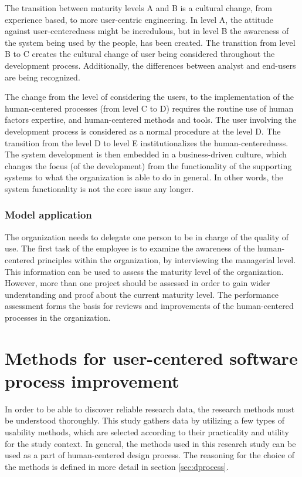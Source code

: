 \documentclass[12pt,a4paper,oneside,pdftex]{report}
\begin{document}
The transition between maturity levels A and B is a cultural change, from experience based, to more user-centric engineering. In level A, the attitude against user-centeredness might be incredulous, but in level B the awareness of the system being used by the people, has been created. The transition from level B to C creates the cultural change of user being considered throughout the development process. Additionally, the differences between analyst and end-users are being recognized. \citep{RefWorks:30}

The change from the level of considering the users, to the implementation of the human-centered processes (from level C to D) requires the routine use of human factors expertise, and human-centered methods and tools. The user involving the development process is considered as a normal procedure at the level D. The transition from the level D to level E institutionalizes the human-centeredness. The system development is then embedded in a business-driven culture, which changes the focus (of the development) from the functionality of the supporting systems to what the organization is able to do in general. In other words, the system functionality is not the core issue any longer.  \citep{RefWorks:30}

\subsection{Model application}

The organization needs to delegate one person to be in charge of the quality of use. The first task of the employee is to examine the awareness of the human-centered principles within the organization, by interviewing the managerial level. This information can be used to assess the maturity level of the organization. However, more than one project should be assessed in order to gain wider understanding and proof about the current maturity level. The performance assessment forms the basis for reviews and improvements of the human-centered processes in the organization. \citep{RefWorks:30}

\chapter{Methods for user-centered software process improvement}
\label{chapter:methods}


In order to be able to discover reliable research data, the research methods must be understood thoroughly. This study gathers data by utilizing a few types of usability methods, which are selected according to their practicality and utility for the study context. In general, the methods used in this research study can be used as a part of human-centered design process. The reasoning for the choice of the methods is defined in more detail in section \ref{sec:dprocess}. 
\end{document}
